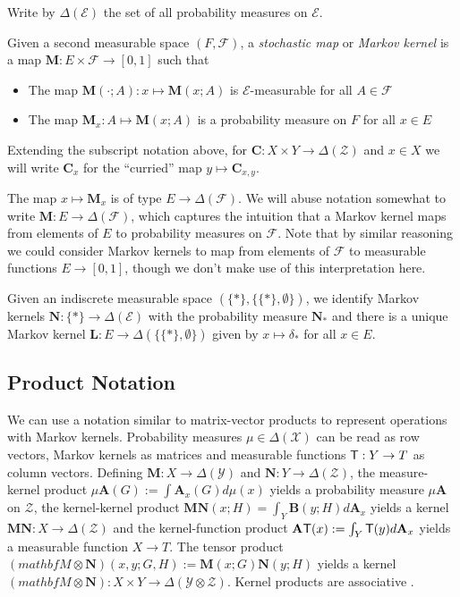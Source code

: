 Write by $\Delta(\mathcal{E})$ the set of all probability measures on $\mathcal{E}$.

Given a second measurable space $(F,\mathcal{F})$, a \emph{stochastic map} or \emph{Markov kernel} is a map $\mathbf{M}:E\times\mathcal{F}\to [0,1]$ such that
\begin{itemize}
	\item The map $\mathbf{M}(\cdot;A):x\mapsto \mathbf{M}(x;A)$ is $\mathcal{E}$-measurable for all $A\in \mathcal{F}$
	\item The map $\mathbf{M}_x:A\mapsto \mathbf{M}(x;A)$ is a probability measure on $F$ for all $x\in E$
\end{itemize}

Extending the subscript notation above, for $\mathbf{C}:X\times Y\to \Delta(\mathcal{Z})$  and $x\in X$ we will write $\mathbf{C}_x$ for the ``curried'' map $y\mapsto \mathbf{C}_{x,y}$.

The map $x\mapsto \mathbf{M}_x$ is of type $E\to \Delta(\mathcal{F})$. We will abuse notation somewhat to write $\mathbf{M}:E\to \Delta(\mathcal{F})$, which captures the intuition that a Markov kernel maps from elements of $E$ to probability measures on $\mathcal{F}$. Note that by similar reasoning we could consider Markov kernels to map from elements of $\mathcal{F}$ to measurable functions $E\to[0,1]$, though we don't make use of this interpretation here.

Given an indiscrete measurable space $(\{*\},\{\{*\},\emptyset\})$, we identify Markov kernels $\mathbf{N}:\{*\}\to \Delta(\mathcal{E})$ with the probability measure $\mathbf{N}_*$ and there is a unique Markov kernel $\mathbf{L}:E\to \Delta(\{\{*\},\emptyset\})$ given by $x\mapsto \delta_*$ for all $x\in E$.

\subsection{Product Notation}

We can use a notation similar to matrix-vector products to represent operations with Markov kernels. Probability measures $\mu\in \Delta(\mathcal{X})$ can be read as row vectors, Markov kernels as matrices and measurable functions $\mathsf{T}:Y\to T$ as column vectors. Defining $\mathbf{M}:X\to \Delta(\mathcal{Y})$ and $\mathbf{N}:Y\to \Delta(\mathcal{Z})$, the measure-kernel product $\mu \mathbf{A} (G) := \int \mathbf{A}_x (G) d\mu(x)$ yields a probability measure $\mu\mathbf{A}$ on $\mathcal{Z}$, the kernel-kernel product $\mathbf{M}\mathbf{N}(x;H)=\int_Y \mathbf{B}(y;H)d\mathbf{A}_x$ yields a kernel $\mathbf{M}\mathbf{N}:X\to \Delta(\mathcal{Z})$ and the kernel-function product $\mathbf{A}\mathsf{T}(x):=\int_Y \mathsf{T}(y) d\mathbf{A}_x$ yields a measurable function $X\to T$. The tensor product $(mathbf{M}\otimes \mathbf{N})(x,y;G,H) := \mathbf{M}(x;G)\mathbf{N}(y;H)$ yields a kernel $(mathbf{M}\otimes \mathbf{N}):X\times Y\to \Delta(\mathcal{Y}\otimes\mathcal{Z})$. Kernel products are associative \citep{cinlar_probability_2011}. 

